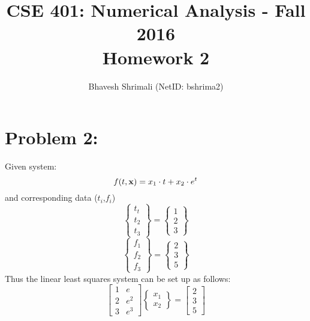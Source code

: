 \documentclass[11pt]{article}
\title{\bf CSE 401: Numerical Analysis - Fall 2016 \\ Homework 2}
\author{Bhavesh Shrimali (NetID: bshrima2)}
\begin{document}
\maketitle
\section*{Problem 2:}
\noindent Given system: 
$$ f(t,{\bf x}) = x_1 \cdot t + x_2 \cdot e^t $$
and corresponding data ($t_i$,$f_i$)
\[
\begin{Bmatrix}
t_t\\t_2\\t_3
\end{Bmatrix}
=
\begin{Bmatrix}
1\\2\\3
\end{Bmatrix}
\]
\[
\begin{Bmatrix}
f_1\\
f_2\\
f_3
\end{Bmatrix}
=
\begin{Bmatrix}
2\\3\\5
\end{Bmatrix}
\]
Thus the linear least squares system can be set up as follows:
\[
\begin{bmatrix}
1 & e \\
2 & e^2 \\
3 & e^3
\end{bmatrix}
\begin{Bmatrix}
x_1\\x_2
\end{Bmatrix}
=
\begin{bmatrix}
2\\3\\5
\end{bmatrix}
\]
\end{document}
